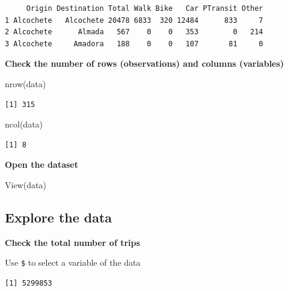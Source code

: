 \documentclass[
  letterpaper,
  DIV=11,
  numbers=noendperiod]{scrreprt}
\newenvironment{Shaded}{\begin{snugshade}}{\end{snugshade}}
\newcommand{\FunctionTok}[1]{\textcolor[rgb]{0.28,0.35,0.67}{#1}}
\newcommand{\NormalTok}[1]{\textcolor[rgb]{0.00,0.23,0.31}{#1}}
\newcommand{\SpecialCharTok}[1]{\textcolor[rgb]{0.37,0.37,0.37}{#1}}
\begin{document}
\begin{verbatim}
     Origin Destination Total Walk Bike   Car PTransit Other
1 Alcochete   Alcochete 20478 6833  320 12484      833     7
2 Alcochete      Almada   567    0    0   353        0   214
3 Alcochete     Amadora   188    0    0   107       81     0
\end{verbatim}

\textbf{Check the number of rows (observations) and columns (variables)}

\begin{Shaded}
\begin{Highlighting}[]
\FunctionTok{nrow}\NormalTok{(data)}
\end{Highlighting}
\end{Shaded}

\begin{verbatim}
[1] 315
\end{verbatim}

\begin{Shaded}
\begin{Highlighting}[]
\FunctionTok{ncol}\NormalTok{(data)}
\end{Highlighting}
\end{Shaded}

\begin{verbatim}
[1] 8
\end{verbatim}

\textbf{Open the dataset}

\begin{Shaded}
\begin{Highlighting}[]
\FunctionTok{View}\NormalTok{(data)}
\end{Highlighting}
\end{Shaded}

\subsection{Explore the data}\label{explore-the-data}

\textbf{Check the total number of trips}

Use \texttt{\$} to select a variable of the data

\begin{Shaded}
\end{Shaded}

\begin{verbatim}
[1] 5299853
\end{verbatim}
\end{document}
